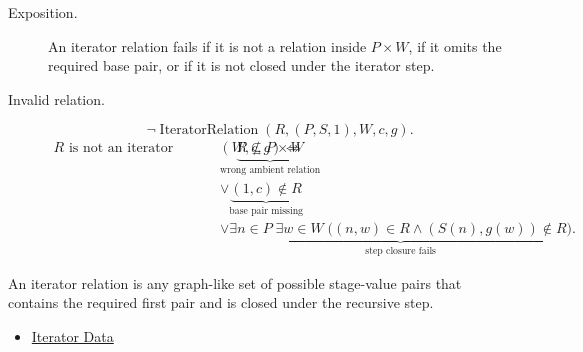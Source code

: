 \begin{remark*}
\begin{description}
  \item[Exposition.]
  An iterator relation fails if it is not a relation inside $P\times W$, if
  it omits the required base pair, or if it is not closed under the iterator
  step.
  \item[Invalid relation.]
  \[
  \neg\operatorname{IteratorRelation}(R,(P,S,1),W,c,g).
  \]
  \[
  \begin{aligned}
  R \text{ is not an iterator relation for } (W,c,g)
  \Longleftrightarrow\;&
  \underbrace{R\not\subseteq P\times W}_{\text{wrong ambient relation}}\\
  &\lor \underbrace{(1,c)\notin R}_{\text{base pair missing}}\\
  &\lor \underbrace{\exists n\in P\;\exists w\in W\;
  \bigl((n,w)\in R\land (S(n),g(w))\notin R\bigr)}_{\text{step closure fails}}.
  \end{aligned}
  \]
\end{description}
\end{remark*}

\begin{remark*}[Interpretation]
An iterator relation is any graph-like set of possible stage-value pairs that
contains the required first pair and is closed under the recursive step.
\end{remark*}

\begin{dependencies}
\begin{itemize}
  \item \hyperref[def:iterator-data-on-peano-system]{Iterator Data}
\end{itemize}
\end{dependencies}

